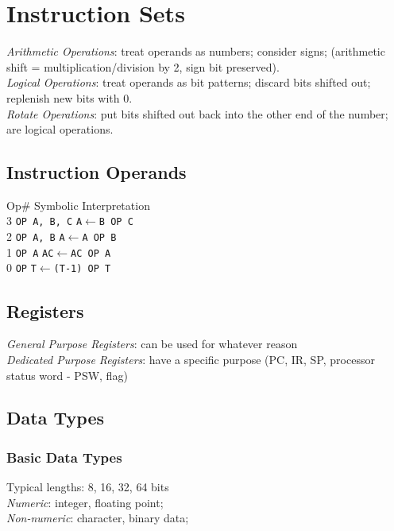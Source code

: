 \section{Instruction Sets}

\emph{Arithmetic Operations}: treat operands as numbers; consider signs;
(\eg arithmetic shift = multiplication/division by 2, sign bit preserved).\\
\emph{Logical Operations}: treat operands as bit patterns; discard bits shifted out;
replenish new bits with 0.\\
\emph{Rotate Operations}: put bits shifted out back into the other end of the number;
are logical operations.\\

\subsection*{Instruction Operands}
Op\# \hfill Symbolic \hfill Interpretation\\
3 \hspace*{0.2\linewidth} \texttt{OP A, B, C} \hfill \texttt{A$\gets$B OP C}\\
2 \hspace*{0.2\linewidth} \texttt{OP A, B} \hfill \texttt{A$\gets$A OP B}\\
1 \hspace*{0.2\linewidth} \texttt{OP A} \hfill \texttt{AC$\gets$AC OP A}\\
0 \hspace*{0.2\linewidth} \texttt{OP} \hfill \texttt{T$\gets$(T-1) OP T}\\

\subsection*{Registers}
\emph{General Purpose Registers}: can be used for whatever reason\\
\emph{Dedicated Purpose Registers}: have a specific purpose (\eg PC, IR, SP, processor status word - PSW, flag)

\subsection*{Data Types}

\subsubsection*{Basic Data Types}
Typical lengths: 8, 16, 32, 64 bits\\
\emph{Numeric}: integer, floating point;\\
\emph{Non-numeric}: character, binary data;

